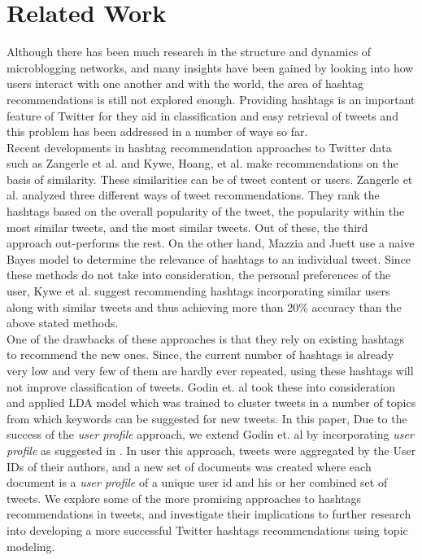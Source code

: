 \documentclass{acm_proc_article-sp}
\begin{document}
\section{Related Work}
\hspace*{5mm}Although there has been much research in the structure and dynamics of microblogging networks, and many insights have been gained by looking into how users interact with one another and with the world, the area of hashtag recommendations is still not explored enough. Providing hashtags is an important feature of Twitter for they aid in classification and easy retrieval of tweets and this problem has been addressed in a number of ways so far.\\
\hspace*{5mm}Recent developments in hashtag recommendation approaches to Twitter data such as Zangerle et al. \cite{zangerle2011recommending} and Kywe, Hoang, et al.\cite{kywe2012recommending} make recommendations on the basis of similarity. These similarities can be of tweet content or users. Zangerle et al. \cite{zangerle2011recommending} analyzed three different ways of tweet recommendations. They rank the hashtags based on the overall popularity of the tweet, the popularity within the most similar tweets, and the most similar tweets. Out of these, the third approach out-performs the rest. On the other hand, Mazzia and Juett \cite{mazzia2009suggesting} use a naive Bayes model to determine the relevance of hashtags to an individual tweet. Since these methods do not take into consideration, the personal preferences of the user, Kywe et al. \cite{kywe2012recommending} suggest recommending hashtags incorporating similar users along with similar tweets and thus achieving more than 20\% accuracy than the above stated methods.\\
\hspace*{5mm}One of the drawbacks of these approaches is that they rely on existing hashtags to recommend the new ones. Since, the current number of hashtags is already very low and very few of them are hardly ever repeated, using these hashtags will not improve classification of tweets. \cite{godin2013using} Godin et. al took these into consideration and applied LDA model which was trained to cluster tweets in a number of topics from which keywords can be suggested for new tweets. 
\hspace*{5mm}In this paper, Due to the success of the \textit{user profile} approach, we extend Godin et. al \cite{godin2013using} by incorporating \textit{user profile} as suggested in \cite{hong2010empirical}. In user this approach, tweets were aggregated by the User IDs of their authors, and a new set of documents was created where each document is a \textit{user profile} of a unique user id and his or her combined set of tweets. We explore some of the more promising approaches to hashtags recommendations in tweets, and investigate their implications to further research into developing a more successful Twitter hashtags recommendations using topic modeling.\\
\end{document}
